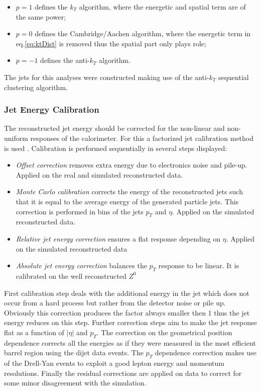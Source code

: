 \begin{itemize}
 \item $p = 1$ defines the $k_{T}$ algorithm, where the energetic and spatial term are of the same power;
 \item $p = 0$ defines the Cambridge/Aachen algorithm, where the energetic term in eq.\ref{eq:ktDist} is removed thus the spatial part only plays role;
 \item $p = -1$ defines the anti-$k_{T}$ algorithm.
\end{itemize}

The jets for this analyses were constructed making use of the anti-$k_{T}$ sequential clustering algorithm. 

\subsubsection{Jet Energy Calibration}\label{ssec:JCal}

The reconstructed jet energy should be corrected for the non-linear and non-uniform responses of the calorimeter. For this a factorized jet calibration
method is used \cite{2011JInst...611002C}. Calibration is performed sequentially in several steps displayed:

\begin{itemize}
 \item \textit{Offset correction} removes extra energy due to electronics noise and pile-up. Applied on the real and simulated reconstructed data.
 \item \textit{Monte Carlo calibration} corrects the energy of the reconstructed jets such that it is equal to the average energy of the generated 
 particle jets. This correction is performed in bins of the jets $p_{T}$ and $\eta$. Applied on the simulated reconstructed data.
 \item \textit{Relative jet energy correction} ensures a flat response depending on $\eta$. Applied on the simulated reconstructed data
 \item \textit{Absolute jet energy correction} balances the $p_{T}$ response to be linear. It is calibrated on the well reconstructed $Z^{0}$
\end{itemize}


First calibration step deals with the additional energy in the jet which does not occur from a hard process but rather from the detector noise or pile up. 
Obviously this correction produces the factor always smaller then 1 thus the jet energy reduces on this step. Further correction steps aim to make the jet response
flat as a function of $|\eta|$ and $p_{T}$. The correction on the geometrical position dependence corrects all the energies as if they were measured 
in the most efficient barrel region using the dijet data events. The $p_{T}$ dependence correction makes use of the Drell-Yan events to exploit a good
lepton energy and momentum resolutions. Finally the residual corrections are applied on data to correct for some minor disagreement with the simulation.

